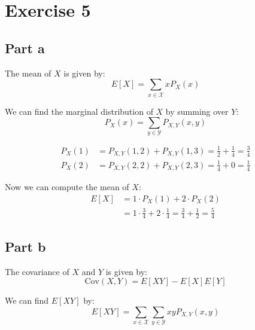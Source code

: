 \section{Exercise 5}

\subsection{Part a}

The mean of $X$ is given by:
\[
	E[X] = \sum_{x\in\mathcal{X}}xP_X(x)
\]

We can find the marginal distribution of $X$ by summing over $Y$:
\[
	P_X(x) = \sum_{y\in\mathcal{Y}}P_{X,Y}(x,y)
\]

\begin{align*}
	P_X(1) & = P_{X,Y}(1,2) + P_{X,Y}(1,3) = \frac{1}{2} + \frac{1}{4} = \frac{3}{4} \\
	P_X(2) & = P_{X,Y}(2,2) + P_{X,Y}(2,3) = \frac{1}{4} + 0 = \frac{1}{4}
\end{align*}

Now we can compute the mean of $X$:
\begin{align*}
	E[X] & = 1\cdot P_X(1) + 2\cdot P_X(2)                                                   \\
	     & = 1\cdot\frac{3}{4} + 2\cdot\frac{1}{4} = \frac{3}{4} + \frac{1}{2} = \frac{5}{4}
\end{align*}

\subsection{Part b}

The covariance of $X$ and $Y$ is given by:
\[
	\text{Cov}(X,Y) = E[XY] - E[X]E[Y]
\]

We can find $E[XY]$ by:
\[
	E[XY] = \sum_{x\in\mathcal{X}}\sum_{y\in\mathcal{Y}}xyP_{X,Y}(x,y)
\]

